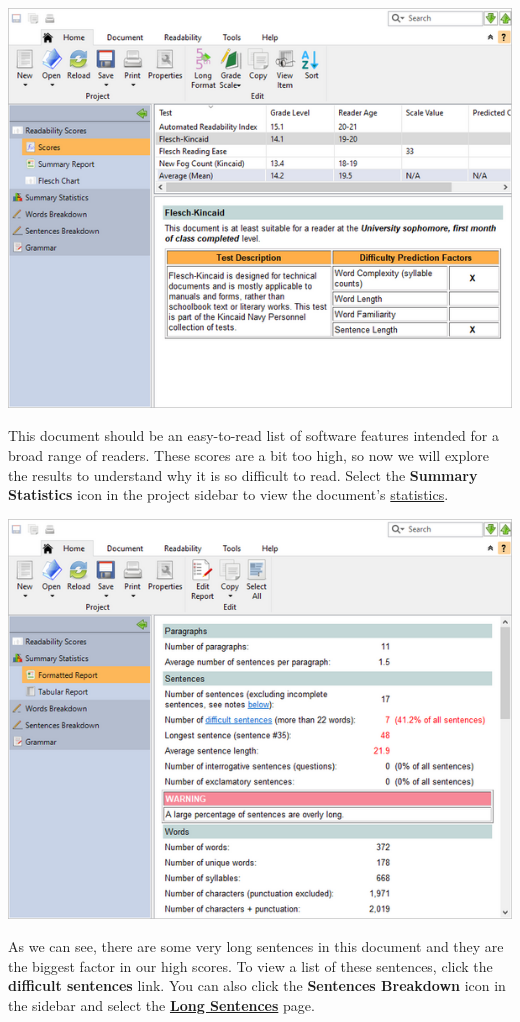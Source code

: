 \documentclass[
]{book}
\theoremstyle{definition}
\theoremstyle{definition}
\theoremstyle{definition}
\theoremstyle{definition}
\theoremstyle{remark}
\begin{document}
\includegraphics{Images/featuresscores.png}

This document should be an easy-to-read list of software features intended for a broad range of readers. These scores are a bit too high, so now we will explore the results to understand why it is so difficult to read. Select the \textbf{Summary Statistics} icon in the project sidebar to view the document's \protect\hyperlink{reviewing-statistics}{statistics}.

\includegraphics{Images/featuresstats.png}

As we can see, there are some very long sentences in this document and they are the biggest factor in our high scores. To view a list of these sentences, click the \textbf{difficult sentences} link. You can also click the \textbf{Sentences Breakdown} icon in the sidebar and select the \protect\hyperlink{reviewing-sentences-breakdown}{\textbf{Long Sentences}} page.
\end{document}
